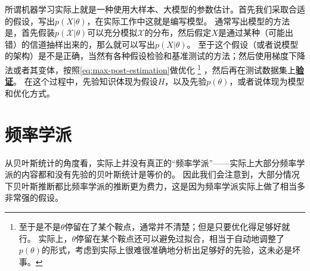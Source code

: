 \documentclass[hyperref, UTF8, a4paper]{ctexart}
\newcommand*{\concept}[1]{\underline{\textbf{#1}}}
\begin{document}
所谓机器学习实际上就是一种使用大样本、大模型的参数估计。首先我们采取合适的假设，写出$p(X | \theta)$，在实际工作中这就是编写模型。
通常写出模型的方法是，首先假装$p(\mathcal{X}|\theta)$可以充分模拟$\mathcal{X}$的分布，然后假定$X$是通过某种（可能出错）的信道抽样出来的，那么就可以写出$p(X | \theta)$。
至于这个假设（或者说模型的架构）是不是正确，当然有各种假设检验和基准测试的方法；然后使用梯度下降法或者其变体，按照\eqref{eq:max-post-estimation}做优化%
\footnote{至于是不是$\theta$停留在了某个鞍点，通常并不清楚；但是只要优化得足够好就行。
实际上，$\theta$停留在某个鞍点还可以避免过拟合，相当于自动地调整了$p(\theta)$的形式，考虑到实际上很难很准确地分析出足够好的先验，这未必是坏事。}%
，然后再在测试数据集上\concept{验证}。
在这个过程中，先验知识体现为假设$H$，以及先验$p(\theta)$，或者说体现为模型和优化方式。

\section{频率学派}

从贝叶斯统计的角度看，实际上并没有真正的“频率学派”——实际上大部分频率学派的内容都和没有先验的贝叶斯统计是等价的。
因此我们会注意到，大部分情况下贝叶斯推断都比频率学派的推断更为费力，这是因为频率学派实际上做了相当多非常强的假设。
\end{document}
